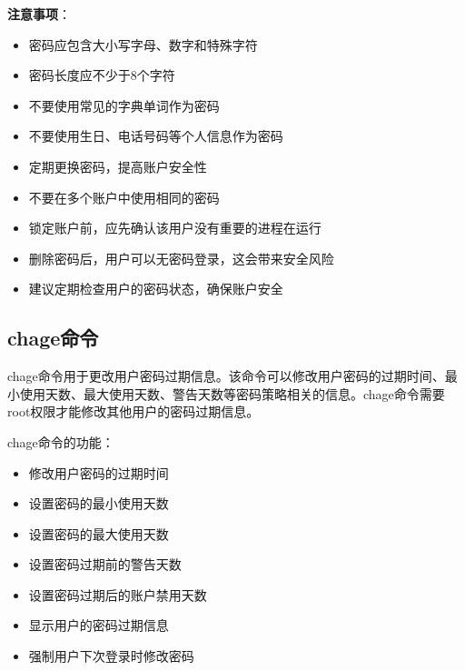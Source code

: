 \documentclass[12pt,UTF8]{ctexbook}
\begin{document}
\textbf{注意事项}：
\begin{itemize}
    \item 密码应包含大小写字母、数字和特殊字符
    \item 密码长度应不少于8个字符
    \item 不要使用常见的字典单词作为密码
    \item 不要使用生日、电话号码等个人信息作为密码
    \item 定期更换密码，提高账户安全性
    \item 不要在多个账户中使用相同的密码
    \item 锁定账户前，应先确认该用户没有重要的进程在运行
    \item 删除密码后，用户可以无密码登录，这会带来安全风险
    \item 建议定期检查用户的密码状态，确保账户安全
\end{itemize}

\subsection{chage命令}
chage命令用于更改用户密码过期信息。该命令可以修改用户密码的过期时间、最小使用天数、最大使用天数、警告天数等密码策略相关的信息。chage命令需要root权限才能修改其他用户的密码过期信息。

chage命令的功能：
\begin{itemize}
    \item 修改用户密码的过期时间
    \item 设置密码的最小使用天数
    \item 设置密码的最大使用天数
    \item 设置密码过期前的警告天数
    \item 设置密码过期后的账户禁用天数
    \item 显示用户的密码过期信息
    \item 强制用户下次登录时修改密码
\end{itemize}
\end{document}

